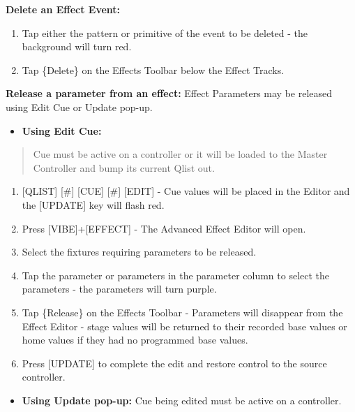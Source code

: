 \documentclass[
]{article}
\providecommand{\tightlist}{%
  \setlength{\itemsep}{0pt}\setlength{\parskip}{0pt}}
\begin{document}
\textbf{Delete an Effect Event:}

\begin{enumerate}
\def\labelenumi{\arabic{enumi}.}
\item
  Tap either the pattern or primitive of the event to be deleted - the background will turn red.
\item
  Tap \{Delete\} on the Effects Toolbar below the Effect Tracks.
\end{enumerate}

\textbf{Release a parameter from an effect:} Effect Parameters may be released using Edit Cue or Update pop-up.

\begin{itemize}
\tightlist
\item
  \textbf{Using Edit Cue:}
\end{itemize}

\begin{quote}
Cue must be active on a controller or it will be loaded to the Master Controller and bump its current Qlist out.
\end{quote}

\begin{enumerate}
\def\labelenumi{\arabic{enumi}.}
\item
  {[}QLIST{]} {[}\#{]} {[}CUE{]} {[}\#{]} {[}EDIT{]} - Cue values will be placed in the Editor and the {[}UPDATE{]} key will flash red.
\item
  Press {[}VIBE{]}+{[}EFFECT{]} - The Advanced Effect Editor will open.
\item
  Select the fixtures requiring parameters to be released.
\item
  Tap the parameter or parameters in the parameter column to select the parameters - the parameters will turn purple.
\item
  Tap \{Release\} on the Effects Toolbar - Parameters will disappear from the Effect Editor - stage values will be returned to their recorded base values or home values if they had no programmed base values.
\item
  Press {[}UPDATE{]} to complete the edit and restore control to the source controller.
\end{enumerate}

\begin{itemize}
\tightlist
\item
  \textbf{Using Update pop-up:} Cue being edited must be active on a controller.
\end{itemize}
\end{document}
